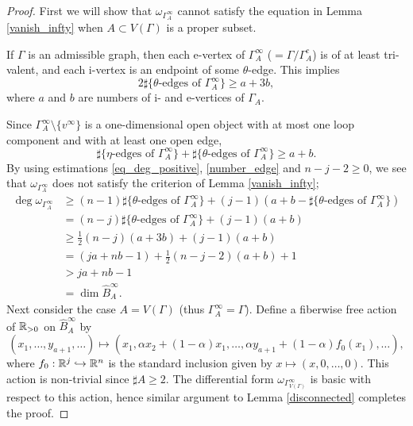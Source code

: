 \begin{proof}
First we will show that $\omega_{\Gamma^{\infty}_A}$ cannot satisfy the equation in Lemma \ref{vanish_infty} when
$A \subset V(\Gamma )$ is a proper subset.


If $\Gamma$ is an admissible graph, then each e-vertex of $\Gamma^{\infty}_A$ ($=\Gamma / \Gamma^c_A$) is of at least
tri-valent, and each i-vertex is an endpoint of some $\theta$-edge.
This implies
\begin{equation}\label{eq_deg_positive}
 2\sharp \{ \theta\text{-edges of }\Gamma^{\infty}_A \} \ge a+3b,
\end{equation}
where $a$ and $b$ are numbers of i- and e-vertices of $\Gamma_A$.


Since $\Gamma^{\infty}_A \setminus \{ v^{\infty}\}$ is a one-dimensional open object with at most one loop component and
with at least one open edge,
\begin{equation}\label{number_edge}
 \sharp \{ \eta \text{-edges of } \Gamma^{\infty}_A \} + \sharp \{ \theta \text{-edges of } \Gamma^{\infty}_A \} \ge a+b.
\end{equation}
By using estimations \eqref{eq_deg_positive}, \eqref{number_edge} and $n-j-2\ge 0$, we see that
$\omega_{\Gamma^{\infty}_A}$ does not satisfy the criterion of Lemma \ref{vanish_infty};
\begin{align*}
 \deg \omega_{\Gamma^{\infty}_A}
 & \ge (n-1)\sharp \{ \theta \text{-edges of } \Gamma^{\infty}_A \}
  +(j-1)(a+b-\sharp \{ \theta \text{-edges of } \Gamma^{\infty}_A \} ) \\
 & = (n-j)\sharp \{ \theta \text{-edges of } \Gamma^{\infty}_A \} + (j-1)(a+b) \\
 & \ge \frac{1}{2}(n-j)(a+3b) + (j-1)(a+b) \\
 & = (ja+nb-1) +\frac{1}{2}(n-j-2)(a+b)+1 \\
 & > ja+nb-1 \\
 & = \dim \hat{B}^{\infty}_A .
\end{align*}
Next consider the case $A=V(\Gamma )$ (thus $\Gamma^{\infty}_A =\Gamma$).
Define a fiberwise free action of $\mathbb{R}_{>0}$ on $\hat{B}^{\infty}_A$ by
\[
 (x_1 ,\dots ,y_{a+1},\dots ) \longmapsto
 (x_1 , \alpha x_2 +(1-\alpha )x_1 , \dots ,\alpha y_{a+1} + (1-\alpha )f_0 (x_1 ), \dots ),
\]
where $f_0 : \mathbb{R}^j \hookrightarrow \mathbb{R}^n$ is the standard inclusion given by $x \mapsto (x,0,\dots ,0)$.
This action is non-trivial since $\sharp A \ge 2$.
The differential form $\omega_{\Gamma^{\infty}_{V(\Gamma)}}$ is basic with respect to this action, hence similar argument
to Lemma \ref{disconnected} completes the proof.
\end{proof}


